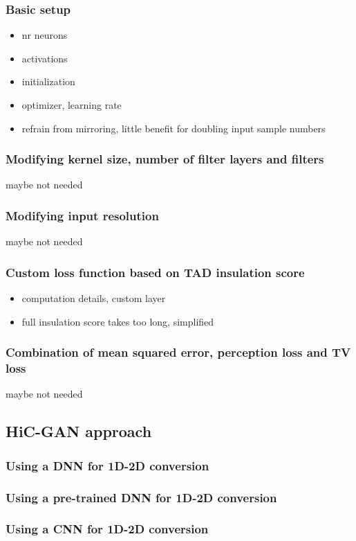 \subsubsection{Basic setup}
\begin{itemize}
 \item nr neurons
 \item activations
 \item initialization
 \item optimizer, learning rate
 \item refrain from mirroring, little benefit for doubling input sample numbers
\end{itemize}

\subsubsection{Modifying kernel size, number of filter layers and filters}
maybe not needed
\subsubsection{Modifying input resolution}
maybe not needed

\subsubsection{Custom loss function based on TAD insulation score}
\begin{itemize}
 \item computation details, custom layer
 \item full insulation score takes too long, simplified
\end{itemize}

\subsubsection{Combination of mean squared error, perception loss and TV loss}
maybe not needed

\subsection{HiC-GAN approach}
\subsubsection{Using a DNN for 1D-2D conversion}
\subsubsection{Using a pre-trained DNN for 1D-2D conversion}
\subsubsection{Using a CNN for 1D-2D conversion}








